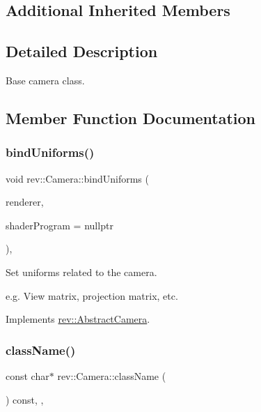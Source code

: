 \subsection*{Additional Inherited Members}


\subsection{Detailed Description}
Base camera class. 

\subsection{Member Function Documentation}
\mbox{\label{classrev_1_1_camera_aacdb899dc9745568b6c45240fd114e7d}} 
\subsubsection{\texorpdfstring{bindUniforms()}{bindUniforms()}}
{\footnotesize\ttfamily void rev\+::\+Camera\+::bind\+Uniforms (\begin{DoxyParamCaption}\item[{const \mbox{\hyperlink{classrev_1_1_main_renderer}{Main\+Renderer}} $\ast$}]{renderer,  }\item[{\mbox{\hyperlink{classrev_1_1_shader_program}{Shader\+Program}} $\ast$}]{shader\+Program = {\ttfamily nullptr} }\end{DoxyParamCaption})\hspace{0.3cm}{\ttfamily [override]}, {\ttfamily [virtual]}}



Set uniforms related to the camera. 

e.\+g. View matrix, projection matrix, etc. 

Implements \mbox{\hyperlink{classrev_1_1_abstract_camera_a6dceba3b328d5e9c3543975e3ae370c0}{rev\+::\+Abstract\+Camera}}.

\mbox{\label{classrev_1_1_camera_afce9a32f0fcc9e0851d73aa37441c815}} 
\subsubsection{\texorpdfstring{className()}{className()}}
{\footnotesize\ttfamily const char$\ast$ rev\+::\+Camera\+::class\+Name (\begin{DoxyParamCaption}{ }\end{DoxyParamCaption}) const\hspace{0.3cm}{\ttfamily [inline]}, {\ttfamily [override]}, {\ttfamily [virtual]}}



